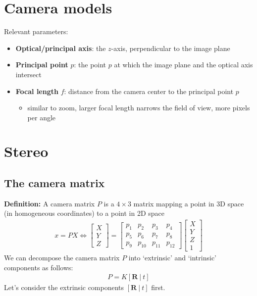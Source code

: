 \documentclass[11pt]{article}
\begin{document}
\section{Camera models}
Relevant parameters: 
\begin{itemize}
    \item \textbf{Optical/principal axis}: the $z$-axis, perpendicular to the image plane 
    \item \textbf{Principal point} $p$: the point $p$ at which the image plane and the optical axis intersect
    \item \textbf{Focal length} $f$: distance from the camera center to the principal point $p$
    \begin{itemize}
        \item similar to zoom, larger focal length narrows the field of view, more pixels per angle
    \end{itemize}
\end{itemize}

\section{Stereo}
\subsection{The camera matrix}
\textbf{Definition:} A camera matrix $P$ is a $4 \times 3$ matrix mapping a point in 3D space (in homogeneous coordinates) to a point in 2D space
\begin{align*}
    x = PX \iff 
    \begin{bmatrix}
        X \\ Y \\ Z 
    \end{bmatrix} = 
    \begin{bmatrix}
        p_1 & p_2 & p_3 & p_4 \\
        p_5 & p_6 & p_7 & p_8 \\
        p_9 & p_{10} & p_{11} & p_{12}
    \end{bmatrix} 
    \begin{bmatrix}
        X \\ Y \\ Z \\ 1
    \end{bmatrix}
\end{align*}
We can decompose the camera matrix $P$ into `extrinsic' and `intrinsic' components as follows: 
\begin{align*}
    P = K [\mathbf{R}~|~t]
\end{align*}
Let's consider the extrinsic components $[\mathbf{R}~|~t]$ first. 
\end{document}
